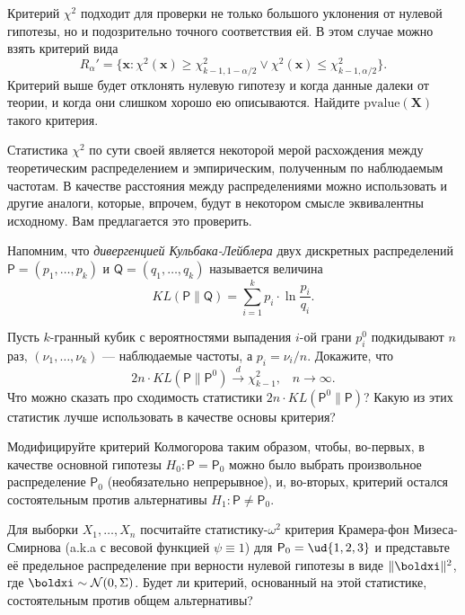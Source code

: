 \begin{problem}
	Критерий $\chi^2$ подходит для проверки не только большого уклонения от нулевой гипотезы, но и подозрительно точного соответствия ей. В этом случае можно взять критерий вида
\[
R_{\alpha}' = \{\mathbf{x}\colon \chi^2(\mathbf{x}) \ge \chi^2_{k-1,1-\alpha/2} \vee \chi^2(\mathbf{x}) \le \chi^2_{k-1,\alpha/2}\}.
\]
Критерий выше будет отклонять нулевую гипотезу и когда данные далеки от теории, и когда они слишком хорошо ею описываются. Найдите $\textrm{pvalue}(\mathbf X)$ такого критерия.
\end{problem}

\begin{problem}\label{distance_equivalence}
    Статистика $\chi^2$ по сути своей является некоторой мерой расхождения между теоретическим распределением и эмпирическим, полученным по наблюдаемым частотам. В качестве расстояния между распределениями можно использовать и другие аналоги, которые, впрочем, будут в некотором смысле эквивалентны исходному. Вам предлагается это проверить.
    
    Напомним, что \textit{дивергенцией Кульбака-Лейблера} двух дискретных распределений $\mathsf{P} = (p_1, \ldots, p_k)$ и $\mathsf{Q} = (q_1, \ldots, q_k)$ называется величина
    \[
    KL(\mathsf{P} \parallel \mathsf{Q}) = \sum_{i=1}^k p_i \cdot \ln\frac{p_i}{q_i}.
    \]

    Пусть $k$-гранный кубик с вероятностями выпадения $i$-ой грани $p_i^0$ подкидывают $n$ раз, $(\nu_1, \ldots, \nu_k)$ --- наблюдаемые частоты, а $p_i = \nu_i / n$. Докажите, что
    \[
    2n \cdot KL(\mathsf{P} \parallel \mathsf{P}^0) \stackrel{d}{\rightarrow} \chi^2_{k-1},\;\;\;n\to \infty.
    \]
    Что можно сказать про сходимость статистики $2n \cdot KL(\mathsf{P}^0 \parallel \mathsf{P})$? Какую из этих статистик лучше использовать в качестве основы критерия?
\end{problem}

\begin{problem}
    Модифицируйте критерий Колмогорова таким образом, чтобы, во-первых, в качестве основной гипотезы $H_0\colon \mathsf{P} = \mathsf{P}_0$ можно было выбрать произвольное распределение $\mathsf{P}_0$ (необязательно непрерывное), и, во-вторых, критерий остался состоятельным против альтернативы $H_1\colon \mathsf{P} \ne \mathsf{P}_0$.
\end{problem}

\begin{problem}
	Для выборки $X_1, \ldots, X_n$ посчитайте статистику-$\omega^2$ критерия Крамера-фон Мизеса-Смирнова (a.k.a с весовой функцией $\psi \equiv 1$) для $\mathsf{P}_0 = \ud\{1, 2, 3\}$ и представьте её предельное распределение при верности нулевой гипотезы в виде $\|\boldxi\|^2$, где $\boldxi \sim \mathcal{N}(0, \Sigma)$. Будет ли критерий, основанный на этой статистике, состоятельным против общем альтернативы?
\end{problem}

